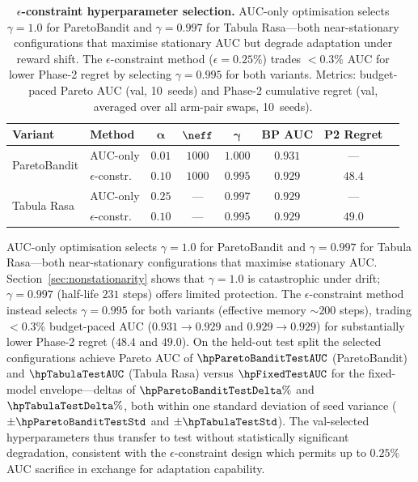 \begin{table}[t]
\centering
\caption{%
  \textbf{$\epsilon$-constraint hyperparameter selection.}
  AUC-only optimisation selects $\gamma{=}1.0$ for ParetoBandit
  and $\gamma{=}0.997$ for Tabula Rasa---both near-stationary
  configurations that maximise stationary AUC but degrade
  adaptation under reward shift.
  The $\epsilon$-constraint method ($\epsilon{=}0.25\%$) trades
  ${<}0.3\%$ AUC for lower Phase-2 regret by selecting
  $\gamma{=}0.995$ for both variants.
  Metrics: budget-paced Pareto AUC (val, 10~seeds) and Phase-2
  cumulative regret (val, averaged over all arm-pair swaps,
  10~seeds).%
}
\label{tab:hparam_selection}
\small
\begin{tabular}{@{}llcccccc@{}}
\toprule
\textbf{Variant} & \textbf{Method}
  & $\boldsymbol{\alpha}$ & $\boldsymbol{\neff}$
  & $\boldsymbol{\gamma}$
  & \textbf{BP AUC} & \textbf{P2 Regret} \\
\midrule
\multirow{2}{*}{ParetoBandit}
  & AUC-only     & $0.01$ & $1000$ & $1.000$ & $0.931$ & --- \\
  & $\epsilon$-constr.\ & $0.10$ & $1000$ & $0.995$ & $0.929$ & $\mathbf{48.4}$ \\[3pt]
\multirow{2}{*}{Tabula Rasa}
  & AUC-only     & $0.25$ & ---    & $0.997$ & $0.929$ & --- \\
  & $\epsilon$-constr.\ & $0.10$ & ---    & $0.995$ & $0.929$ & $\mathbf{49.0}$ \\
\bottomrule
\end{tabular}
\end{table}

AUC-only optimisation selects $\gamma{=}1.0$ for ParetoBandit
and $\gamma{=}0.997$ for Tabula Rasa---both near-stationary
configurations that maximise stationary AUC.
Section~\ref{sec:nonstationarity} shows that $\gamma{=}1.0$
is catastrophic under drift; $\gamma{=}0.997$ (half-life $231$
steps) offers limited protection.
The $\epsilon$-constraint method instead selects $\gamma{=}0.995$
for both variants (effective memory ${\sim}200$ steps),
trading ${<}0.3\%$ budget-paced AUC ($0.931 \to 0.929$ and
$0.929 \to 0.929$) for substantially lower Phase-2 regret
($48.4$ and $49.0$).
On the held-out test split the selected configurations achieve
Pareto AUC of $\hpParetoBanditTestAUC$ (ParetoBandit) and
$\hpTabulaTestAUC$ (Tabula Rasa) versus $\hpFixedTestAUC$ for the
fixed-model envelope---deltas of $\hpParetoBanditTestDelta\%$ and
$\hpTabulaTestDelta\%$, both within one standard deviation of
seed variance ($\pm\hpParetoBanditTestStd$ and
$\pm\hpTabulaTestStd$).
The val-selected hyperparameters thus transfer to test without
statistically significant degradation, consistent with the
$\epsilon$-constraint design which permits up to $0.25\%$ AUC
sacrifice in exchange for adaptation capability.

